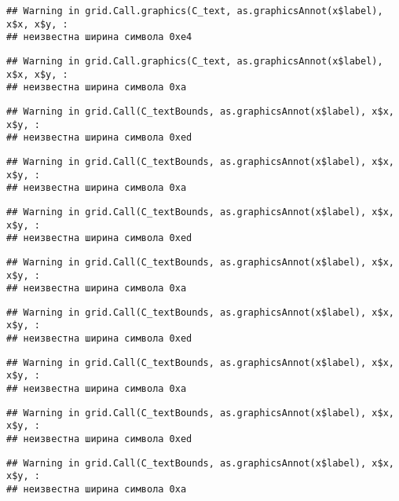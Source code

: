 \documentclass[
]{article}
\begin{document}
\begin{verbatim}
## Warning in grid.Call.graphics(C_text, as.graphicsAnnot(x$label), x$x, x$y, :
## неизвестна ширина символа 0xe4
\end{verbatim}

\begin{verbatim}
## Warning in grid.Call.graphics(C_text, as.graphicsAnnot(x$label), x$x, x$y, :
## неизвестна ширина символа 0xa
\end{verbatim}

\begin{verbatim}
## Warning in grid.Call(C_textBounds, as.graphicsAnnot(x$label), x$x, x$y, :
## неизвестна ширина символа 0xed
\end{verbatim}

\begin{verbatim}
## Warning in grid.Call(C_textBounds, as.graphicsAnnot(x$label), x$x, x$y, :
## неизвестна ширина символа 0xa
\end{verbatim}

\begin{verbatim}
## Warning in grid.Call(C_textBounds, as.graphicsAnnot(x$label), x$x, x$y, :
## неизвестна ширина символа 0xed
\end{verbatim}

\begin{verbatim}
## Warning in grid.Call(C_textBounds, as.graphicsAnnot(x$label), x$x, x$y, :
## неизвестна ширина символа 0xa
\end{verbatim}

\begin{verbatim}
## Warning in grid.Call(C_textBounds, as.graphicsAnnot(x$label), x$x, x$y, :
## неизвестна ширина символа 0xed
\end{verbatim}

\begin{verbatim}
## Warning in grid.Call(C_textBounds, as.graphicsAnnot(x$label), x$x, x$y, :
## неизвестна ширина символа 0xa
\end{verbatim}

\begin{verbatim}
## Warning in grid.Call(C_textBounds, as.graphicsAnnot(x$label), x$x, x$y, :
## неизвестна ширина символа 0xed
\end{verbatim}

\begin{verbatim}
## Warning in grid.Call(C_textBounds, as.graphicsAnnot(x$label), x$x, x$y, :
## неизвестна ширина символа 0xa
\end{verbatim}
\end{document}
